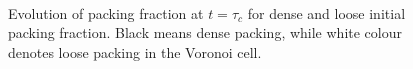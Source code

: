 \begin{figure}[htbp]
\centering
{}\\
\caption{Evolution of packing fraction at $t = \tau_c$ for dense and loose 
initial packing fraction. Black means dense packing, while white colour denotes 
loose packing in the Voronoi cell.}
\label{fig:Dense_Loose_voro}
\end{figure}

